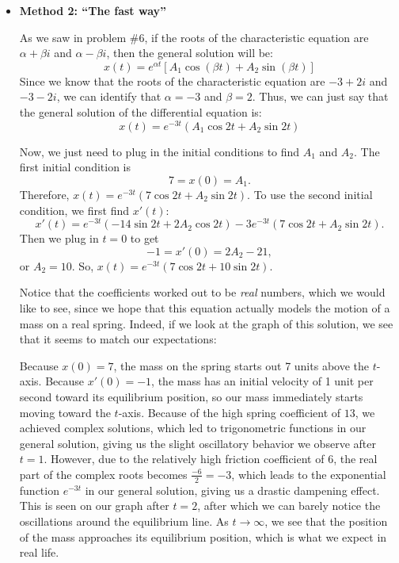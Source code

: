 \documentclass[main]{subfiles}
\begin{document}
\begin{enumerate}[resume]
\begin{solution}
\begin{itemize}
    \item \textbf{Method 2: ``The fast way''}

As we saw in problem \#6, if the roots of the characteristic equation are $\alpha + \beta i$ and $\alpha - \beta i$, then the general solution will be:
$$x(t)=e^{\alpha t}\left[A_1\cos(\beta t)+A_2\sin(\beta t)\right]$$
    Since we know that the roots of the characteristic equation are
    $-3 + 2i$ and $-3 - 2i$, we can identify that $\alpha=-3$ and $\beta=2$. Thus, we can just say that the general solution
    of the differential equation is:
     $$x(t) = e^{-3t} (A_1 \cos 2t + A_2\sin 2t)$$

    Now, we just need to plug in the initial conditions to find $A_1$
    and $A_2$.  The first initial condition is
    \[ 7 = x(0) = A_1.\]
    Therefore, $x(t) = e^{-3t} (7 \cos 2t + A_2 \sin 2t)$. 
    To use the second initial condition, we first find $x'(t)$:
    \[ x'(t) = e^{-3t} (-14 \sin 2t + 2 A_2 \cos 2t) - 3e^{-3t} (7
    \cos 2t + A_2 \sin 2t).\] Then we plug in $t = 0$ to get
    \[ -1 = x'(0) = 2 A_2 - 21,\] or $A_2 = 10$.  So, $
    \boxed{x(t)=e^{-3t} \left( 7 \cos 2t + 10 \sin 2t \right)}$.

Notice that the coefficients worked out to be \textit{real} numbers, which we would like to see, since we hope that this equation actually models the motion of a mass on a real spring. Indeed, if we look at the graph of this solution, we see that it seems to match our expectations:


\begin{center}
\end{center}

Because $x(0)=7$, the mass on the spring starts out 7 units above the $t$-axis. Because $x'(0)=-1$, the mass has an initial velocity of 1 unit per second toward its equilibrium position, so our mass immediately starts moving toward the $t$-axis. Because of the high spring coefficient of $13$, we achieved complex solutions, which led to trigonometric functions in our general solution, giving us the slight oscillatory behavior we observe after $t=1$. However, due to the relatively high friction coefficient of $6$, the real part of the complex roots becomes $\frac{-6}{2}=-3$, which leads to the exponential function $e^{-3t}$ in our general solution, giving us a drastic dampening effect. This is seen on our graph after $t=2$, after which we can barely notice the oscillations around the equilibrium line. As $t \to \infty$, we see that the position of the mass approaches its equilibrium position, which is what we expect in real life.
  \end{itemize}
  \end{solution}  
  

\end{enumerate}
\end{document}
